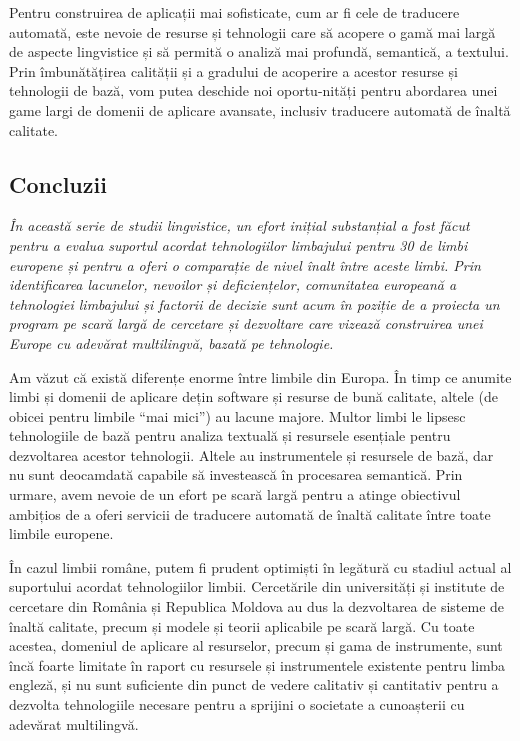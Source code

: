 \documentclass[]{../../metanetpaper}
\begin{document}
\begin{multicols}{2}
Pentru construirea de aplicații mai sofisticate, cum ar fi cele de traducere automată, este nevoie de resurse și tehnologii care să acopere o gamă mai largă de aspecte lingvistice și să permită o analiză mai profundă, semantică, a textului. Prin îmbunătățirea calității și a gradului de acoperire a acestor resurse și tehnologii de bază, vom putea deschide noi oportu-\newline nități pentru abordarea unei game largi de domenii de aplicare avansate, inclusiv traducere automată de înaltă calitate.

\subsection{Concluzii}

\emph{În această serie de studii lingvistice, un efort inițial substanțial a fost făcut pentru a evalua suportul acordat tehnologiilor limbajului pentru 30 de limbi europene și pentru a oferi o comparație de nivel înalt între aceste limbi. Prin identificarea lacunelor, nevoilor și deficiențelor, comunitatea europeană a tehnologiei limbajului și factorii de decizie sunt acum în poziție de a proiecta un program pe scară largă de cercetare și dezvoltare care vizează construirea unei Europe cu adevărat multilingvă, bazată pe tehnologie.}

Am văzut că există diferențe enorme între limbile din Europa. În timp ce anumite limbi și domenii de aplicare dețin software și resurse de bună calitate, altele (de obicei pentru limbile “mai mici”) au lacune majore. Multor limbi le lipsesc tehnologiile de bază pentru analiza textuală și resursele esențiale pentru dezvoltarea acestor tehnologii. Altele au instrumentele și resursele de bază, dar nu sunt deocamdată capabile să investească în procesarea semantică. Prin urmare, avem nevoie de un efort pe scară largă pentru a atinge obiectivul ambițios de a oferi servicii de traducere automată de înaltă calitate între toate limbile europene.

În cazul limbii române, putem fi prudent optimiști în legătură cu stadiul actual al suportului acordat tehnologiilor limbii. Cercetările din universități și institute de cercetare din România și Republica Moldova au dus la dezvoltarea de sisteme de înaltă calitate, precum și modele și teorii aplicabile pe scară largă. Cu toate acestea, domeniul de aplicare al resurselor, precum și gama de instrumente, sunt încă foarte limitate în raport cu resursele și instrumentele existente pentru limba engleză, și nu sunt suficiente din punct de vedere calitativ și cantitativ pentru a dezvolta tehnologiile necesare pentru a sprijini o societate a cunoașterii cu adevărat multilingvă. 


\end{multicols}
\end{document}
